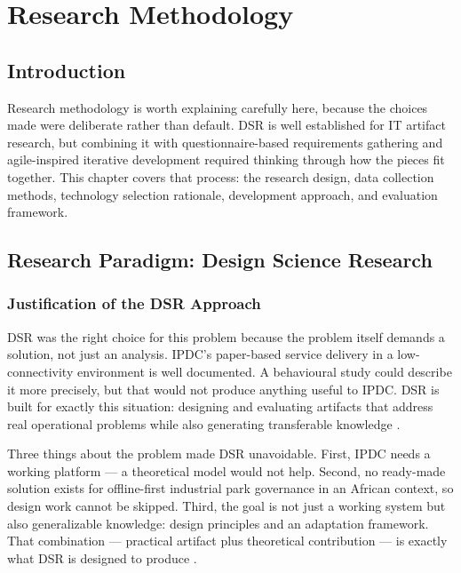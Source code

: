 \chapter{Research Methodology}
\label{ch:methodology}

\section{Introduction}

Research methodology is worth explaining carefully here, because the choices made were deliberate rather than default. DSR is well established for IT artifact research, but combining it with questionnaire-based requirements gathering and agile-inspired iterative development required thinking through how the pieces fit together. This chapter covers that process: the research design, data collection methods, technology selection rationale, development approach, and evaluation framework.

\section{Research Paradigm: Design Science Research}

\subsection{Justification of the DSR Approach}

DSR was the right choice for this problem because the problem itself demands a solution, not just an analysis. IPDC's paper-based service delivery in a low-connectivity environment is well documented. A behavioural study could describe it more precisely, but that would not produce anything useful to IPDC. DSR is built for exactly this situation: designing and evaluating artifacts that address real operational problems while also generating transferable knowledge \citep{Hevner2004}.

Three things about the problem made DSR unavoidable. First, IPDC needs a working platform --- a theoretical model would not help. Second, no ready-made solution exists for offline-first industrial park governance in an African context, so design work cannot be skipped. Third, the goal is not just a working system but also generalizable knowledge: design principles and an adaptation framework. That combination --- practical artifact plus theoretical contribution --- is exactly what DSR is designed to produce \citep{Gregor2013}.

